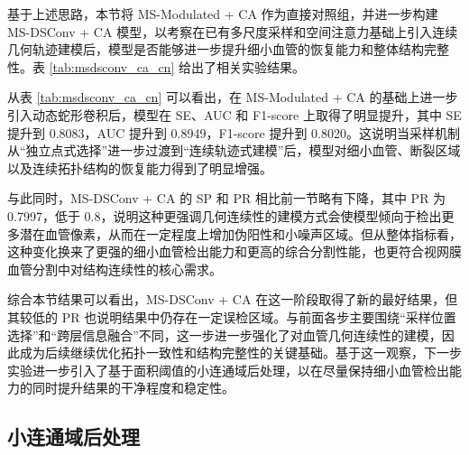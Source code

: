 \documentclass[a4paper,12pt]{article}
\begin{document}
基于上述思路，本节将 MS-Modulated + CA 作为直接对照组，并进一步构建 MS-DSConv + CA 模型，以考察在已有多尺度采样和空间注意力基础上引入连续几何轨迹建模后，模型是否能够进一步提升细小血管的恢复能力和整体结构完整性。表 \ref{tab:msdsconv_ca_cn} 给出了相关实验结果。

\begin{table}[htbp]
\centering
\caption{MS-Modulated + CA 与 MS-DSConv + CA 实验结果对比}
\label{tab:msdsconv_ca_cn}
\end{table}

从表 \ref{tab:msdsconv_ca_cn} 可以看出，在 MS-Modulated + CA 的基础上进一步引入动态蛇形卷积后，模型在 SE、AUC 和 F1-score 上取得了明显提升，其中 SE 提升到 0.8083，AUC 提升到 0.8949，F1-score 提升到 0.8020。这说明当采样机制从“独立点式选择”进一步过渡到“连续轨迹式建模”后，模型对细小血管、断裂区域以及连续拓扑结构的恢复能力得到了明显增强。

与此同时，MS-DSConv + CA 的 SP 和 PR 相比前一节略有下降，其中 PR 为 0.7997，低于 0.8，说明这种更强调几何连续性的建模方式会使模型倾向于检出更多潜在血管像素，从而在一定程度上增加伪阳性和小噪声区域。但从整体指标看，这种变化换来了更强的细小血管检出能力和更高的综合分割性能，也更符合视网膜血管分割中对结构连续性的核心需求。

综合本节结果可以看出，MS-DSConv + CA 在这一阶段取得了新的最好结果，但其较低的 PR 也说明结果中仍存在一定误检区域。与前面各步主要围绕“采样位置选择”和“跨层信息融合”不同，这一步进一步强化了对血管几何连续性的建模，因此成为后续继续优化拓扑一致性和结构完整性的关键基础。基于这一观察，下一步实验进一步引入了基于面积阈值的小连通域后处理，以在尽量保持细小血管检出能力的同时提升结果的干净程度和稳定性。

\subsection{小连通域后处理}
\end{document}
